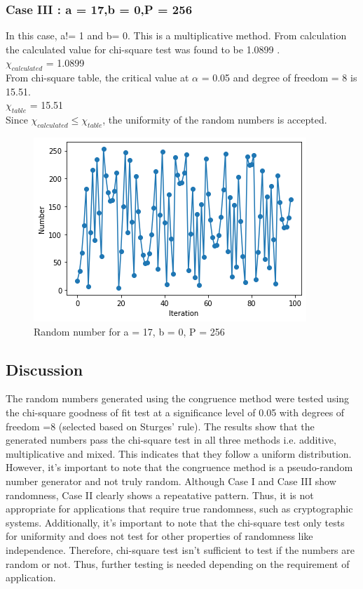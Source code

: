 \documentclass[10pt,journal,cspaper,compsoc]{IEEEtran}
\begin{document}
  \subsubsection*{Case III : a = 17,b = 0,P = 256}
  In this case, a!= 1 and b= 0. This is a multiplicative method.
  From calculation the calculated value for chi-square test was found to be 1.0899 .\\
  $\chi_{calculated}$ = 1.0899\\
  From chi-square table, the critical value at $\alpha$ = 0.05 and degree of freedom = 8 is 15.51.\\
  $\chi_{table}$ = 15.51\\
  Since $\chi_{calculated} \leq \chi_{table}$, the uniformity of the random numbers is accepted.
  \begin{figure}[h!]
    \centering
    \includegraphics[scale = 0.65]{images/Exp3_Example3.png}
    \caption{Random number for a = 17, b = 0, P = 256}
  \end{figure}
\subsection{Discussion}
The random numbers generated using the congruence method were tested using the chi-square goodness of fit test at a significance level of 0.05 with degrees of freedom =8 (selected based on Sturges' rule). 
The results show that the generated numbers pass the chi-square test in all three methods i.e. additive, multiplicative and mixed. 
This indicates that they follow a uniform distribution. 
However, it's important to note that the congruence method is a pseudo-random number generator and not truly random. 
Although Case I and Case III show randomness, Case II clearly shows a repeatative pattern.
Thus, it is not appropriate for applications that require true randomness, such as cryptographic systems. 
Additionally, it's important to note that the chi-square test only tests for uniformity and does not test for other properties of randomness like independence. 
Therefore, chi-square test isn't sufficient to test if the numbers are random or not. 
Thus, further testing is needed depending on the requirement of application.
\end{document}
